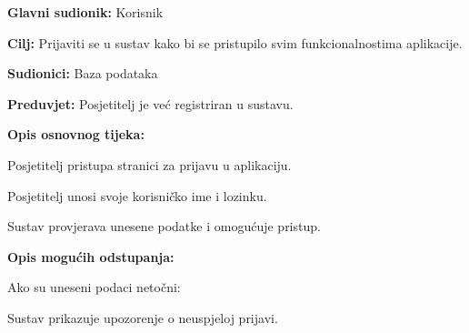 					\noindent {}
					\begin{packed_item}
						
						\item \textbf{Glavni sudionik: }Korisnik
						\item  \textbf{Cilj:} Prijaviti se u sustav kako bi se pristupilo svim funkcionalnostima aplikacije.
						\item  \textbf{Sudionici:} Baza podataka
						\item  \textbf{Preduvjet:} Posjetitelj je već registriran u sustavu.
						\item  \textbf{Opis osnovnog tijeka:}
						
						\item[] \begin{packed_enum}
							
							\item Posjetitelj pristupa stranici za prijavu u aplikaciju.
							\item Posjetitelj unosi svoje korisničko ime i lozinku.
							\item Sustav provjerava unesene podatke i omogućuje pristup.
						\end{packed_enum}
						
						\item  \textbf{Opis mogućih odstupanja:}
						
						\item[] \begin{packed_item}
							
							\item[3.a] Ako su uneseni podaci netočni:
							\item[] \begin{packed_enum}
								
								\item Sustav prikazuje upozorenje o neuspjeloj prijavi.
								
							\end{packed_enum}

						\end{packed_item}
					\end{packed_item}
					
